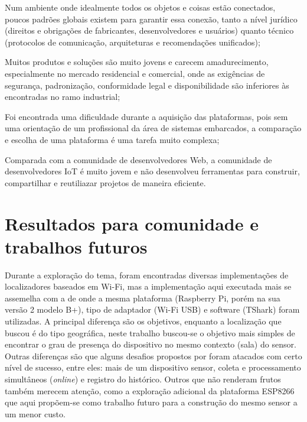 \begin{alineas}
	\item Num ambiente onde
	idealmente todos os objetos e coisas estão conectados, poucos padrões globais
	existem para garantir essa conexão, tanto a nível jurídico (direitos e
	obrigações de fabricantes, desenvolvedores e usuários) quanto técnico
	(protocolos de comunicação, arquiteturas e recomendações unificados);

	\item Muitos produtos e soluções são muito jovens e carecem amadurecimento,
	especialmente no mercado residencial e comercial, onde as exigências de
	segurança, padronização, conformidade legal e disponibilidade são inferiores
	às encontradas no ramo industrial;

	\item Foi encontrada uma dificuldade durante a aquisição das plataformas, pois
	sem uma orientação de um profissional da área de sistemas embarcados, a
	comparação e escolha de uma plataforma é uma tarefa muito complexa;

	\item Comparada com a comunidade de desenvolvedores Web, a comunidade
	de desenvolvedores IoT é muito jovem e não desenvolveu ferramentas para
	construir, compartilhar e reutiliazar projetos de maneira eficiente.
\end{alineas}


\section{Resultados para comunidade e trabalhos futuros}
\label{sec:trab-futuros}

Durante a exploração do tema, foram encontradas diversas implementações de
localizadores baseados em Wi-Fi, mas a implementação aqui executada mais se
assemelha com a de  onde a mesma plataforma
(Raspberry Pi, porém na sua versão 2 modelo B+), tipo de adaptador (Wi-Fi USB)
e software (TShark) foram utilizadas. A principal diferença são os
objetivos, enquanto a localização que  buscou é do tipo
geográfica, neste trabalho buscou-se o objetivo mais simples de encontrar o grau
de presença do dispositivo no mesmo contexto (sala) do sensor. Outras diferenças
são que alguns desafios propostos por  foram atacados
com certo nível de sucesso, entre eles: mais de um dispositivo sensor,
coleta e processamento simultâneos (\emph{online}) e registro do histórico.
Outros que não renderam frutos também merecem atenção, como a exploração
adicional da plataforma ESP8266 que aqui propõem-se como trabalho futuro para a
construção do mesmo sensor a um menor custo.
